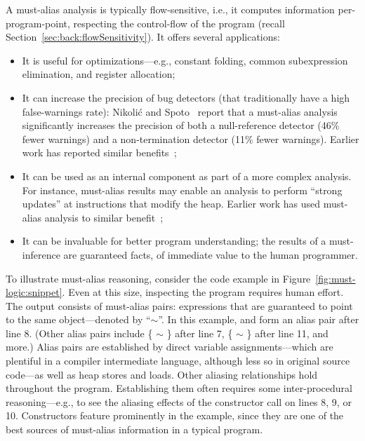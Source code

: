 A must-alias analysis is typically flow-sensitive, i.e., it computes information per-program-point, respecting the control-flow of the program (recall Section~\ref{sec:back:flowSensitivity}). It offers several applications:

\begin{itemize}
\item It is useful for optimizations---e.g., constant folding, common subexpression elimination, and register allocation;

\item It can increase the precision of bug detectors (that traditionally have a high false-warnings rate): Nikoli\'{c} and Spoto~\cite{ictac:2012:Nikolic} report that a must-alias analysis significantly increases the precision of both a null-reference detector (46\% fewer warnings) and a non-termination detector (11\% fewer warnings). Earlier work has reported similar benefits~\cite{isola:2008:Ma};

\item It can be used as an internal component as part of a more complex analysis. For instance, must-alias results may enable an analysis to perform ``strong updates'' at instructions that modify the heap. Earlier work has used must-alias analysis to similar benefit~\cite{pldi:1994:Emami,popl:1998:Jagannathan};

\item It can be invaluable for better program understanding; the results of a must-inference are guaranteed facts, of immediate value to the human programmer.
\end{itemize}

To illustrate must-alias reasoning, consider the code example in Figure~\ref{fig:must-logic:snippet}. Even at this size, inspecting the program requires human effort. The output consists of must-alias pairs: expressions that are guaranteed to point to the same object---denoted by ``$\sim$''. In this example,  and  form an alias pair after line 8. (Other alias pairs include \{ $\sim$ \} after line 7, \{ $\sim$ \} after line 11, and more.) Alias pairs are established by direct variable assignments---which are plentiful in a compiler intermediate language, although less so in original source code---as well as heap stores and loads. Other aliasing relationships hold throughout the program. Establishing them often requires some inter-procedural reasoning---e.g., to see the aliasing effects of the constructor call on lines 8, 9, or 10. Constructors feature prominently in the example, since they are one of the best sources of must-alias information in a typical program.

